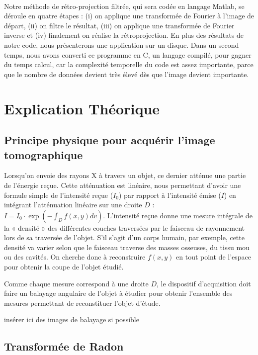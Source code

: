 \documentclass[conference]{IEEEtran}
\begin{document}
\\
Notre méthode de rétro-projection filtrée, qui sera codée en langage Matlab, se déroule en quatre étapes : (i) on applique une transformée de Fourier à l’image de départ, (ii)  on filtre le résultat, (iii) on applique une transformée de Fourier inverse et (iv) finalement on réalise la rétroprojection. En plus des résultats de notre code, nous présenterons une application sur un disque. Dans un second temps, nous avons converti ce programme en C, un langage compilé, pour gagner du temps calcul, car la complexité temporelle du code est assez importante, parce que le nombre de données devient très élevé dès que l’image devient importante.

\section{Explication Théorique}

\subsection{Principe physique pour acquérir l'image tomographique}

Lorsqu'on envoie des rayons X à travers un objet, ce dernier atténue une partie de l'énergie reçue.  Cette atténuation est linéaire, nous permettant d'avoir une formule simple de l'intensité reçue ($I_0$) par rapport à l'intensité émise ($I$) en intégrant l'atténuation linéaire sur une droite $D$ : $
I=I_0 \cdot \exp(- \int_{D} f(x,y) dv )
$.
L’intensité reçue donne une mesure intégrale de la « densité » des différentes couches traversées par le faisceau de rayonnement lors de sa traversée de l’objet. S’il s’agit d’un corps humain, par exemple, cette densité va varier selon que le faisceau traverse des masses osseuses, du tissu mou ou des cavités.
On cherche donc à reconstruire $f(x,y)$ en tout point de l’espace pour obtenir la coupe de l’objet étudié.

Comme chaque mesure correspond à une droite $D$, le dispositif d'acquisition doit faire un balayage angulaire de l'objet à étudier pour obtenir l'ensemble des mesures permettant de reconstituer l'objet d'étude.

insérer ici des images de balayage si possible

\subsection{Transformée de Radon}
\end{document}
